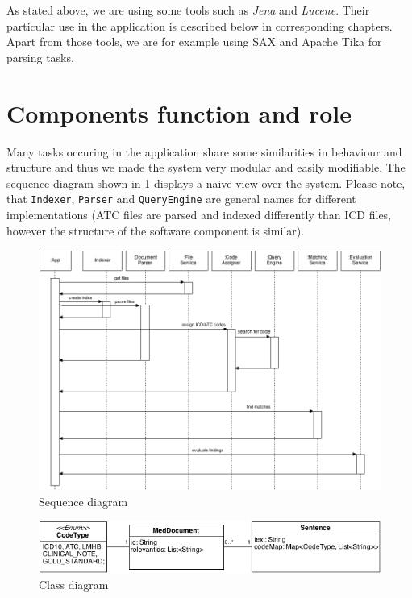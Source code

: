 \documentclass{article}
\begin{document}
As stated above, we are using some tools such as \emph{Jena} and \emph{Lucene}. Their particular use in the application is described below in corresponding chapters. Apart from those tools, we are for example using SAX and Apache Tika for parsing tasks.

\section{Components function and role}
Many tasks occuring in the application share some similarities in behaviour and structure and thus we made the system very modular and easily modifiable. The sequence diagram shown in \ref{fig:seq} displays a naive view over the system. Please note, that \texttt{Indexer}, \texttt{Parser} and \texttt{QueryEngine} are general names for different implementations (ATC files are parsed and indexed differently than ICD files, however the structure of the software component is similar).

\begin{figure}[h!]
    \label{fig:seq}
    \centering
    \includegraphics[width=1.0\textwidth]{seq}
    \caption{Sequence diagram}
\end{figure}

\begin{figure}[h!]
  \centering
    \includegraphics[width=1.0\textwidth]{class}
    \caption{Class diagram}
\end{figure}
\end{document}
